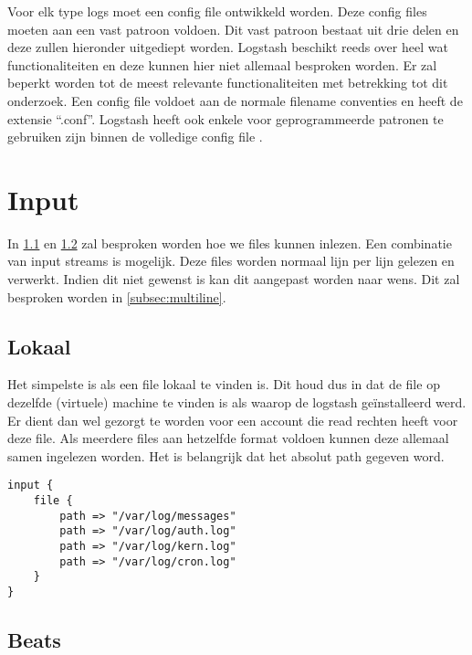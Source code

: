Voor elk type logs moet een config file ontwikkeld worden. Deze config files moeten aan een vast patroon voldoen. Dit vast patroon bestaat uit drie delen en deze zullen hieronder uitgediept worden. 
Logstash beschikt reeds over heel wat functionaliteiten en deze kunnen hier niet allemaal besproken worden. Er zal beperkt worden tot de meest relevante functionaliteiten met betrekking tot dit onderzoek. Een config file voldoet aan de normale filename conventies en heeft de extensie “.conf”.
Logstash heeft ook enkele voor geprogrammeerde patronen te gebruiken zijn binnen de volledige config file \autocite{logstashpatterns}. 


\section{Input}
\label{sec:logstash-input}

In \hyperref[subsec:lokaal]{\ref{subsec:lokaal}} en \hyperref[subsec:beats]{\ref{subsec:beats}} zal besproken worden hoe we files kunnen inlezen. Een combinatie van input streams is mogelijk. Deze files worden normaal lijn per lijn gelezen en verwerkt. Indien dit niet gewenst is kan dit aangepast worden naar wens. Dit zal besproken worden in \hyperref[subsec:multiline]{\ref{subsec:multiline}}.

\subsection{Lokaal}
\label{subsec:lokaal}

Het simpelste is als een file lokaal te vinden is. Dit houd dus in dat  de file op dezelfde (virtuele) machine te vinden is als waarop de logstash geïnstalleerd werd. Er dient dan wel gezorgt te worden voor een account die read rechten heeft voor deze file. Als meerdere files aan hetzelfde format voldoen kunnen deze allemaal samen ingelezen worden.
Het is belangrijk dat het absolut path gegeven word. 
\lstset{escapechar=@,style=customc}        
\begin{lstlisting}[frame=single]  
input {
	file {
		path => "/var/log/messages"
		path => "/var/log/auth.log"
		path => "/var/log/kern.log"
		path => "/var/log/cron.log"
	}
}
\end{lstlisting}


\subsection{Beats}
\label{subsec:beats}

